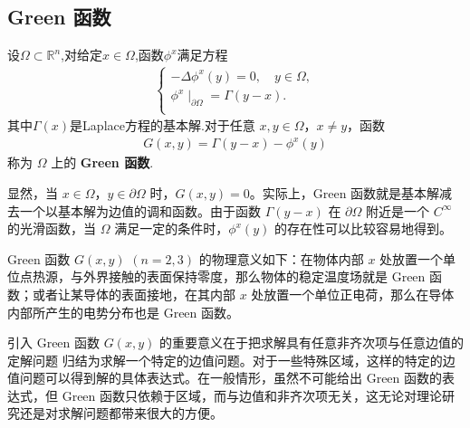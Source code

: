 \documentclass[../../main.tex]{subfiles}%
\begin{document}
\subsection{Green 函数}

\begin{definition}
设$\Omega \subset \mathbb{R}^n$,对给定$x\in \Omega$,函数$\phi^x$满足方程
\begin{align*}
\begin{cases}
-\Delta \phi ^x\left( y \right) =0,\quad y\in \Omega ,\\
\phi ^x\mid _{\partial \Omega}=\varGamma  \left( y-x \right) .\\
\end{cases}
\end{align*}
其中$\varGamma (x)$是Laplace方程的基本解.对于任意 $x,y\in\Omega$，$x\neq y$，函数
\begin{align*}
G(x,y) = \varGamma (y-x) - \phi^x(y)
\end{align*}
称为 $\Omega$ 上的 \textbf{Green 函数}.
\end{definition}
\begin{remark}
显然，当 $x\in\Omega$，$y\in\partial\Omega$ 时，$G(x,y)=0$。实际上，Green 函数就是基本解减去一个以基本解为边值的调和函数。由于函数 $\varGamma (y-x)$ 在 $\partial\Omega$ 附近是一个 $C^\infty$ 的光滑函数，当 $\Omega$ 满足一定的条件时，$\phi^x(y)$ 的存在性可以比较容易地得到。
\end{remark}
\begin{remark}
Green 函数 $G(x,y)$ $(n=2,3)$ 的物理意义如下：在物体内部 $x$ 处放置一个单位点热源，与外界接触的表面保持零度，那么物体的稳定温度场就是 Green 函数；或者让某导体的表面接地，在其内部 $x$ 处放置一个单位正电荷，那么在导体内部所产生的电势分布也是 Green 函数。
\end{remark}
\begin{remark}
引入 Green 函数 $G(x,y)$ 的重要意义在于把求解具有任意非齐次项与任意边值的定解问题  归结为求解一个特定的边值问题。对于一些特殊区域，这样的特定的边值问题可以得到解的具体表达式。在一般情形，虽然不可能给出 Green 函数的表达式，但 Green 函数只依赖于区域，而与边值和非齐次项无关，这无论对理论研究还是对求解问题都带来很大的方便。
\end{remark}
\end{document}

